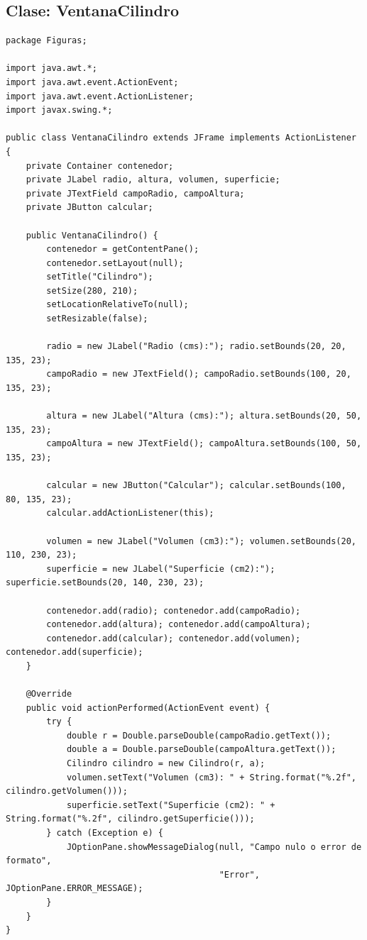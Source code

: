 \documentclass[12pt,a4paper]{article}
\begin{document}
\subsection*{Clase: VentanaCilindro}
\begin{lstlisting}[caption={Clase VentanaCilindro.java}]
package Figuras;

import java.awt.*;
import java.awt.event.ActionEvent;
import java.awt.event.ActionListener;
import javax.swing.*;

public class VentanaCilindro extends JFrame implements ActionListener {
    private Container contenedor;
    private JLabel radio, altura, volumen, superficie;
    private JTextField campoRadio, campoAltura;
    private JButton calcular;

    public VentanaCilindro() {
        contenedor = getContentPane();
        contenedor.setLayout(null);
        setTitle("Cilindro");
        setSize(280, 210);
        setLocationRelativeTo(null);
        setResizable(false);

        radio = new JLabel("Radio (cms):"); radio.setBounds(20, 20, 135, 23);
        campoRadio = new JTextField(); campoRadio.setBounds(100, 20, 135, 23);

        altura = new JLabel("Altura (cms):"); altura.setBounds(20, 50, 135, 23);
        campoAltura = new JTextField(); campoAltura.setBounds(100, 50, 135, 23);

        calcular = new JButton("Calcular"); calcular.setBounds(100, 80, 135, 23);
        calcular.addActionListener(this);

        volumen = new JLabel("Volumen (cm3):"); volumen.setBounds(20, 110, 230, 23);
        superficie = new JLabel("Superficie (cm2):"); superficie.setBounds(20, 140, 230, 23);

        contenedor.add(radio); contenedor.add(campoRadio);
        contenedor.add(altura); contenedor.add(campoAltura);
        contenedor.add(calcular); contenedor.add(volumen); contenedor.add(superficie);
    }

    @Override
    public void actionPerformed(ActionEvent event) {
        try {
            double r = Double.parseDouble(campoRadio.getText());
            double a = Double.parseDouble(campoAltura.getText());
            Cilindro cilindro = new Cilindro(r, a);
            volumen.setText("Volumen (cm3): " + String.format("%.2f", cilindro.getVolumen()));
            superficie.setText("Superficie (cm2): " + String.format("%.2f", cilindro.getSuperficie()));
        } catch (Exception e) {
            JOptionPane.showMessageDialog(null, "Campo nulo o error de formato",
                                          "Error", JOptionPane.ERROR_MESSAGE);
        }
    }
}
\end{lstlisting}
\end{document}
